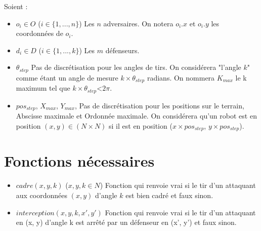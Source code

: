 \documentclass[12pt]{report}
\begin{document}
Soient :
\begin{itemize}
\item $o_i \in O$ ($i \in \{1,..., n\}$) Les $n$ adversaires. On notera $o_i.x$ et $o_i.y$ les coordonnées de $o_i$.
\item $d_i \in D$ ($i \in \{1,..., k\}$) Les $m$ défenseurs.
\item $\theta_{step}$ Pas de discrétisation pour les angles de tirs. On considérera "l'angle $k$" comme étant un angle de mesure $k \times \theta_{step}$ radians. On nommera $K_{max}$ le k maximum tel que $k \times \theta_{step} $<$ 2 \pi$.
\item $pos_{step}$, $X_{max}$, $Y_{max}$, Pas de discrétisation pour les positions sur le terrain, Abscisse  maximale et Ordonnée maximale. On considérera qu'un robot est en position $(x, y) \in (N \times N)$ si il est en position ($x \times pos_{step}$, $y \times pos_{step}$).
\end{itemize}

\chapter{Fonctions nécessaires}
\begin{itemize}
\item $cadre(x, y, k)$ ($x, y, k \in N$) Fonction qui renvoie vrai si le tir d'un attaquant aux coordonnées $(x, y)$ d'angle $k$ est bien cadré et faux sinon.
\item $interception(x, y, k, x', y')$ Fonction qui renvoie vrai si le tir d'un attaquant en (x, y) d'angle k est arrêté par un défenseur en (x', y') et faux sinon.
\end{itemize}
\space
\space
\end{document}
